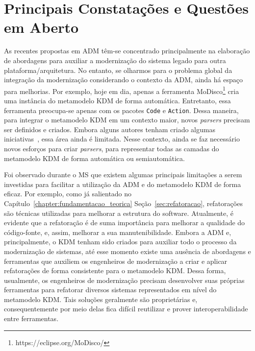 \section{Principais Constatações e Questões em Aberto}\label{subsec:principais_constatações_e_questões_Em_Aberto}

As recentes propostas em ADM têm-se concentrado principalmente na elaboração de abordagens para auxiliar a modernização do sistema legado para outra plataforma/arquitetura. No entanto, se olharmos para o problema global da integração da modernização considerando o contexto da ADM, ainda há espaço para melhorias. Por exemplo, hoje em dia, apenas a ferramenta MoDisco\footnote{https://eclipse.org/MoDisco/} cria uma instância do metamodelo KDM de forma automática. Entretanto, essa ferramenta preocupa-se apenas com os pacotes \texttt{Code} e \texttt{Action}. Dessa maneira, para integrar o metamodelo KDM em um contexto maior, novos \textit{parsers} precisam ser definidos e criados. Embora alguns autores tenham criado algumas iniciativas~\cite{5440163,Bruneliere_2010MODISCO}, essa área ainda é limitada. Nesse contexto, ainda se faz necessário novos esforços para criar \textit{parsers}, para representar todas as camadas do metamodelo KDM de forma automática ou semiautomática.

Foi observado durante o MS que existem algumas principais limitações a serem investidas para facilitar a utilização da ADM e do metamodelo KDM de forma eficaz. Por exemplo, como já salientado no Capítulo~\ref{chapter:fundamentacao_teorica} Seção~\ref{sec:refatoracao}, refatorações são técnicas utilizadas para melhorar a estrutura do software. Atualmente, é evidente que a refatoração é de suma importância para melhorar a qualidade do código-fonte, e, assim, melhorar a sua manutenibilidade.
Embora a ADM e, principalmente, o KDM tenham sido criados para auxiliar todo o processo da modernização de sistemas, até esse momento existe uma ausência de abordagens e ferramentas que auxiliem os engenheiros de modernização a criar e aplicar refatorações de forma consistente para o metamodelo KDM. Dessa forma, usualmente, os engenheiros de modernização precisam desenvolver suas próprias ferramentas para refatorar diversos sistemas representados em nível do metamodelo KDM. Tais soluções geralmente são proprietárias e, consequentemente por meio delas fica difícil reutilizar e prover interoperabilidade entre ferramentas.

